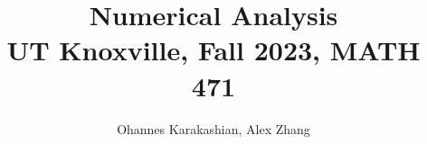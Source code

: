 \documentclass[math]{amznotes}
\title{\textbf{Numerical Analysis}\\
\large UT Knoxville, Fall 2023, MATH 471}
\author{Ohannes Karakashian, Alex Zhang}
\begin{document}
\maketitle
\tableofcontents



\amzindex
\end{document}
